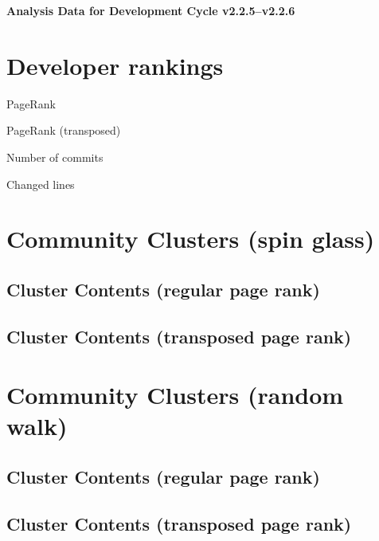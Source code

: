 \documentclass{article}
\begin{document}
\setlength{\parindent}{0pt}
\begin{center}
\begin{Large}
\textbf{Analysis Data for Development Cycle v2.2.5--v2.2.6}
\end{Large}
\end{center}
\section{Developer rankings}
\begin{small}\renewcommand{\tabcolsep}{1pt}
\begin{minipage}{0.5\linewidth}
PageRank\\

\end{minipage}%
\begin{minipage}{0.5\linewidth}
PageRank (transposed)\\

\end{minipage}

\renewcommand{\tabcolsep}{5pt}
\begin{minipage}{0.5\linewidth}
Number of commits\\

\end{minipage}%
\begin{minipage}{0.5\linewidth}
Changed lines\\

\end{minipage}
\end{small}
\newpage\section{Community Clusters (spin glass)}
\subsection{Cluster Contents (regular page rank)}
\newpage\subsection{Cluster Contents (transposed page rank)}
\newpage\section{Community Clusters (random walk)}
\subsection{Cluster Contents (regular page rank)}
\newpage\subsection{Cluster Contents (transposed page rank)}
\end{document}
